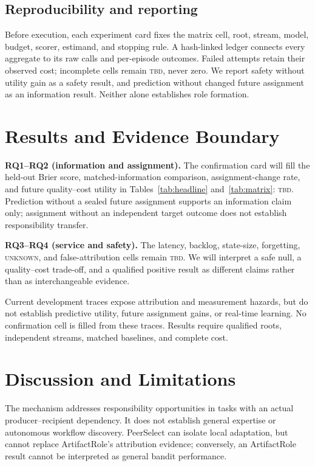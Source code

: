 \documentclass[sigconf,anonymous]{aamas}
\newcommand{\unknown}{\textsc{unknown}}
\begin{document}
\subsection{Reproducibility and reporting}
Before execution, each experiment card fixes the matrix cell, root, stream, model, budget, scorer, estimand, and stopping rule. A hash-linked ledger connects every aggregate to its raw calls and per-episode outcomes. Failed attempts retain their observed cost; incomplete cells remain \textsc{tbd}, never zero. We report safety without utility gain as a safety result, and prediction without changed future assignment as an information result. Neither alone establishes role formation.

\section{Results and Evidence Boundary}
\label{sec:current}

\textbf{RQ1--RQ2 (information and assignment).} The confirmation card will fill the held-out Brier score, matched-information comparison, assignment-change rate, and future quality--cost utility in Tables~\ref{tab:headline} and~\ref{tab:matrix}: \textsc{tbd}. Prediction without a sealed future assignment supports an information claim only; assignment without an independent target outcome does not establish responsibility transfer.

\textbf{RQ3--RQ4 (service and safety).} The latency, backlog, state-size, forgetting, \unknown{}, and false-attribution cells remain \textsc{tbd}. We will interpret a safe null, a quality--cost trade-off, and a qualified positive result as different claims rather than as interchangeable evidence.

Current development traces expose attribution and measurement hazards, but do not establish predictive utility, future assignment gains, or real-time learning. No confirmation cell is filled from these traces. Results require qualified roots, independent streams, matched baselines, and complete cost.

\section{Discussion and Limitations}

The mechanism addresses responsibility opportunities in tasks with an actual producer--recipient dependency. It does not establish general expertise or autonomous workflow discovery. PeerSelect can isolate local adaptation, but cannot replace ArtifactRole's attribution evidence; conversely, an ArtifactRole result cannot be interpreted as general bandit performance.
\end{document}
